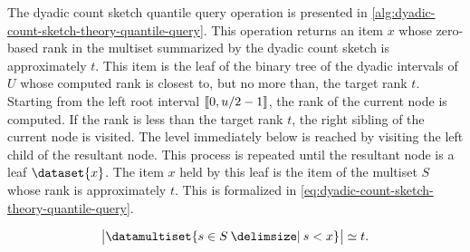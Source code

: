 The dyadic count sketch quantile query operation is presented in \cref{alg:dyadic-count-sketch-theory-quantile-query}.
This operation returns an item \( x \) whose zero-based rank in the multiset summarized by the dyadic count sketch is approximately \( t \).
This item is the leaf of the binary tree of  the dyadic intervals of \( U \) whose computed rank is closest to, but no more than, the target rank \( t \).
Starting from the left root interval \( \llbracket0, u / 2 - 1\rrbracket \), the rank of the current node is computed.
If the rank is less than the target rank \( t \), the right sibling of the current node is visited.
The level immediately below is reached by visiting the left child of the resultant node.
This process is repeated until the resultant node is a leaf \( \dataset{x} \).
The item \( x \) held by this leaf is the item of the multiset \( S \) whose rank is approximately \( t \).
This is formalized in \cref{eq:dyadic-count-sketch-theory-quantile-query}.

\begin{equation}
  \label{eq:dyadic-count-sketch-theory-quantile-query}
  \cardinality[\big]{\datamultiset{s \in S \suchthat s < x}} \simeq t.
\end{equation}
